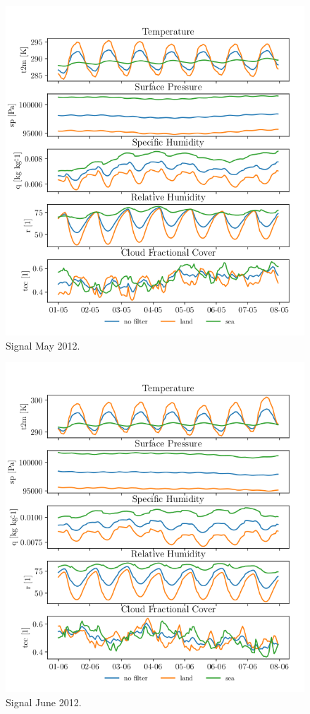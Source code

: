 \begin{figure}[ht]
    \centering
    \includegraphics{python_figs/spatially_averaged_one_week_from_2012-05-01.png}
    \caption{Signal May 2012.}
    \label{fig:may12}
\end{figure}


\begin{figure}[ht]
    \centering
    \includegraphics{python_figs/spatially_averaged_one_week_from_2012-06-01.png}
    \caption{Signal June 2012.}
    \label{fig:jun12}
\end{figure}

